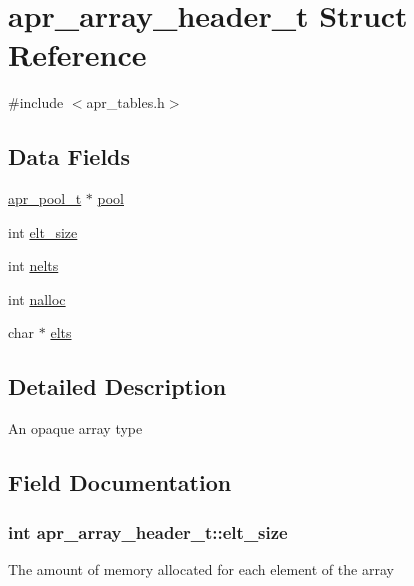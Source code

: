 \hypertarget{structapr__array__header__t}{}\section{apr\+\_\+array\+\_\+header\+\_\+t Struct Reference}
\label{structapr__array__header__t}


{\ttfamily \#include $<$apr\+\_\+tables.\+h$>$}

\subsection*{Data Fields}
\begin{DoxyCompactItemize}
\item 
\hyperlink{group__apr__pools_gaf137f28edcf9a086cd6bc36c20d7cdfb}{apr\+\_\+pool\+\_\+t} $\ast$ \hyperlink{structapr__array__header__t_a68f353ce65943172fcc9494aa9f6e424}{pool}
\item 
int \hyperlink{structapr__array__header__t_a36a690ebc781edc9e99ac1bec53c1770}{elt\+\_\+size}
\item 
int \hyperlink{structapr__array__header__t_ab11b88220885c5a0920a06ac85680055}{nelts}
\item 
int \hyperlink{structapr__array__header__t_a0ceb78a23ebef1bceea5f0cd3e1513b6}{nalloc}
\item 
char $\ast$ \hyperlink{structapr__array__header__t_af8462fa2a1ddf6406c66cd3dd441a269}{elts}
\end{DoxyCompactItemize}


\subsection{Detailed Description}
An opaque array type 

\subsection{Field Documentation}
\subsubsection[{\texorpdfstring{elt\+\_\+size}{elt_size}}]{\setlength{\rightskip}{0pt plus 5cm}int apr\+\_\+array\+\_\+header\+\_\+t\+::elt\+\_\+size}\hypertarget{structapr__array__header__t_a36a690ebc781edc9e99ac1bec53c1770}{}\label{structapr__array__header__t_a36a690ebc781edc9e99ac1bec53c1770}
The amount of memory allocated for each element of the array 
